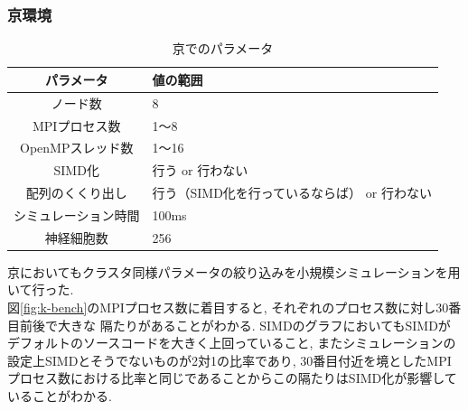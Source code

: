 \subsubsection{京環境}
\begin{table}[htb]
  \caption {京でのパラメータ}
  \begin{center}
    \begin{tabular}{|c|p{12cm}|}
      \hline
      パラメータ & 値の範囲\\ \hline
      ノード数 & 8\\ \hline
      MPIプロセス数 & 1〜8\\ \hline
      OpenMPスレッド数 & 1〜16\\ \hline
      SIMD化 & 行う or 行わない\\ \hline
      配列のくくり出し & 行う（SIMD化を行っているならば） or 行わない\\ \hline
      シミュレーション時間 & 100ms\\ \hline
      神経細胞数 & 256\\ \hline
    \end{tabular}
  \end{center}
\end{table}
京においてもクラスタ同様パラメータの絞り込みを小規模シミュレーションを用いて行った.\\
図\ref{fig:k-bench}のMPIプロセス数に着目すると, それぞれのプロセス数に対し30番目前後で大きな
隔たりがあることがわかる. SIMDのグラフにおいてもSIMDがデフォルトのソースコードを大きく上回っていること,
またシミュレーションの設定上SIMDとそうでないものが2対1の比率であり,
30番目付近を境としたMPIプロセス数における比率と同じであることからこの隔たりはSIMD化が影響していることがわかる.\\
